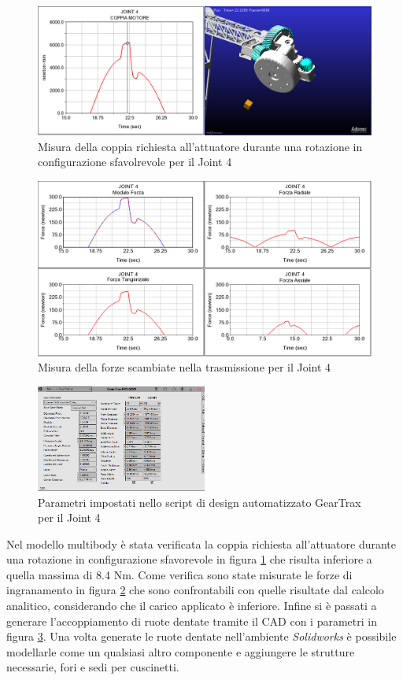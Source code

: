 \documentclass[%
corpo=11pt,
twoside,
 stile=classica,
oldstyle,
greek,%
]{toptesi}
\begin{document}
		\begin{figure} [H]
			\centering
			\includegraphics[width=1\textwidth]{Plots/POLSO1/polso1torque.png}
			\caption{Misura della coppia richiesta all'attuatore durante una rotazione in configurazione sfavolrevole per il Joint 4}
			\label{fig:MBDpolso1t}
		\end{figure} 
		\begin{figure} [H]
			\centering
			\includegraphics[width=1\textwidth]{Plots/POLSO1/polso1forces.png}
			\caption{Misura della forze scambiate nella trasmissione per il Joint 4}
			\label{fig:MBDpolso1f}
		\end{figure} 
		\begin{figure} [H]
			\centering
			\includegraphics[width=0.5\textwidth]{Plots/POLSO1/gear_polso1.png}
			\caption{Parametri impostati nello script di design automatizzato GearTrax per il Joint 4}
			\label{fig:Gearpolso1}
		\end{figure} 
		Nel modello multibody è stata verificata la coppia richiesta all'attuatore durante una rotazione in configurazione sfavorevole in figura \ref{fig:MBDpolso1t} che risulta inferiore a quella massima di 8.4 Nm. Come verifica sono state misurate le forze di ingranamento in figura \ref{fig:MBDpolso1f} che sono confrontabili con quelle risultate dal calcolo analitico, considerando che il carico applicato è inferiore. Infine si è passati a generare l'accoppiamento di ruote dentate tramite il CAD con i parametri in figura \ref{fig:Gearpolso1}. Una volta generate le ruote dentate nell'ambiente \textit{Solidworks} è possibile modellarle come un qualsiasi altro componente e aggiungere le strutture necessarie, fori e sedi per cuscinetti.  
		
\end{document}

